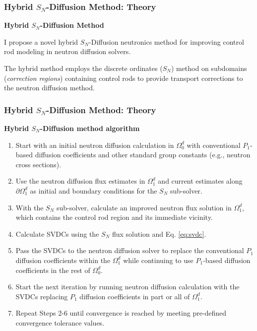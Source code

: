 \begin{frame}
  \frametitle{Hybrid $S_N$-Diffusion Method: Theory}
  \textbf{Hybrid $S_N$-Diffusion Method}

  I propose a novel hybrid $S_N$-Diffusion neutronics method for improving control rod modeling in
  neutron diffusion solvers.

  The hybrid method employs the discrete ordinates ($S_N$) method on subdomains (\textit{correction
  regions}) containing control rods to provide transport corrections to the neutron diffusion
  method.

\end{frame}

\begin{frame}
  \frametitle{Hybrid $S_N$-Diffusion Method: Theory}
  \textbf{Hybrid $S_N$-Diffusion method algorithm}
  \begin{enumerate}
    \item Start with an initial neutron diffusion calculation in $\Omega^d_0$ with conventional
      $P_1$-based diffusion coefficients and other standard group constants (e.g., neutron cross
      sections).
    \item Use the neutron diffusion flux estimates in $\Omega^d_1$ and current estimates along
      $\partial \Omega^d_1$ as initial and boundary conditions for the $S_N$ sub-solver.
    \item With the $S_N$ sub-solver, calculate an improved neutron flux solution in $\Omega^d_1$,
      which contains the control rod region and its immediate vicinity.
    \item Calculate \glspl{SVDC} using the $S_N$ flux solution and Eq. \ref{eq:svdc}.
    \item Pass the \glspl{SVDC} to the neutron diffusion solver to replace the conventional
      $P_1$ diffusion coefficients within the $\Omega^d_1$ while continuing to use $P_1$-based
      diffusion coefficients in the rest of $\Omega^d_0$.
    \item Start the next iteration by running neutron diffusion calculation with the \glspl{SVDC}
      replacing $P_1$ diffusion coefficients in part or all of $\Omega^d_1$.
    \item Repeat Steps 2-6 until convergence is reached by meeting pre-defined convergence tolerance
      values.
  \end{enumerate}
\end{frame}

